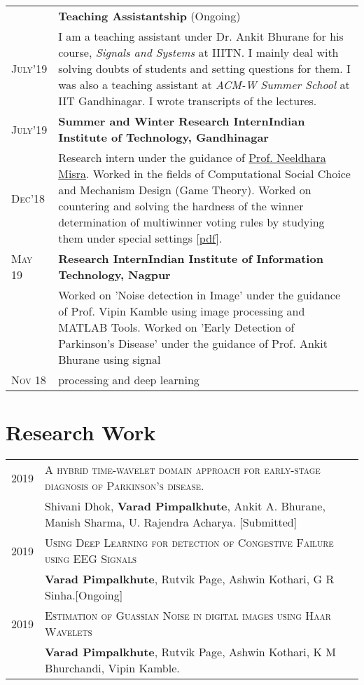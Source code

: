 \documentclass[a4paper,10pt]{extarticle} %
\begin{document}
\begin{tabularx}{\linewidth}{ l | X }
 & \textbf{Teaching Assistantship }(Ongoing)\\
\textsc{July'19} & I am a teaching assistant under Dr. Ankit Bhurane for his course, \textit{Signals and Systems} at IIITN. I mainly deal with solving doubts of students and setting questions for them. I was also a teaching assistant at \textit{ACM-W Summer School} at IIT Gandhinagar. I wrote transcripts of the lectures.\\ 
\textsc{July'19} & \textbf{Summer and Winter Research Intern}\hfill\textbf{Indian Institute of Technology, Gandhinagar}\\
\textsc{Dec'18}& {Research intern under the guidance of \href{http://neeldhara.com/}{Prof. Neeldhara Misra}. Worked in the fields of Computational Social Choice and Mechanism Design (Game Theory). Worked on countering and solving the hardness of the winner determination of multiwinner voting rules by studying them under special settings [\href{https://drive.google.com/file/d/16eH69qaIV4zR65R6IfFjx--N96TYwTv3/view?usp=sharing}{pdf}].}\\


\textsc{May 19} & \textbf{Research Intern}\hfill\textbf{Indian Institute of Information Technology, Nagpur}\\
\textsc{} & { Worked on 'Noise detection in Image' under the guidance of Prof. Vipin Kamble using image processing and MATLAB Tools. Worked on 'Early Detection of Parkinson's Disease' under the guidance of Prof. Ankit Bhurane using signal} \\
\textsc{Nov 18} &  {processing and deep learning}\\
\end{tabularx}


\section{\textcolor{primary}{Research Work}}
\begin{tabularx}{\linewidth}{ l | X }
\textsc{2019} & \textsc{A hybrid time-wavelet domain approach for early-stage diagnosis of Parkinson’s disease.} \\
& Shivani Dhok, \textbf{Varad Pimpalkhute}, Ankit A. Bhurane, Manish Sharma, U. Rajendra Acharya. [Submitted]\\
\textsc{2019} & \textsc{Using Deep Learning for detection of Congestive Failure using EEG Signals} \\
& \textbf{Varad Pimpalkhute}, Rutvik Page, Ashwin Kothari, G R Sinha.[Ongoing] \\
\textsc{2019} & \textsc{Estimation of Guassian Noise in digital images using Haar Wavelets}\\
& \textbf{Varad Pimpalkhute}, Rutvik Page, Ashwin Kothari, K M Bhurchandi, Vipin Kamble. \\

\end{tabularx}
\end{document}
